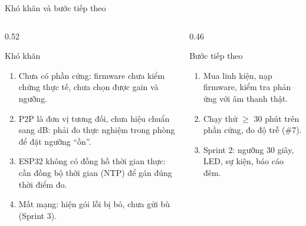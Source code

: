 \documentclass[t, aspectratio=169]{beamer}
\begin{document}
\begin{frame}{Khó khăn và bước tiếp theo}
  \scriptsize
  \begin{columns}[T]
    \begin{column}{0.52\textwidth}
      \begin{alertblock}{Khó khăn}
        \footnotesize
        \begin{enumerate}\setlength{\itemsep}{1pt}
          \item Chưa có phần cứng: firmware chưa kiểm chứng thực tế, chưa chọn được gain và ngưỡng.
          \item P2P là đơn vị tương đối, chưa hiệu chuẩn sang dB: phải đo thực nghiệm trong phòng để đặt ngưỡng ``ồn''.
          \item ESP32 không có đồng hồ thời gian thực: cần đồng bộ thời gian (NTP) để gán đúng thời điểm đo.
          \item Mất mạng: hiện gói lỗi bị bỏ, chưa gửi bù (Sprint 3).
        \end{enumerate}
      \end{alertblock}
    \end{column}
    \begin{column}{0.46\textwidth}
      \begin{block}{Bước tiếp theo}
        \footnotesize
        \begin{enumerate}\setlength{\itemsep}{1pt}
          \item Mua linh kiện, nạp firmware, kiểm tra phản ứng với âm thanh thật.
          \item Chạy thử $\geq$ 30 phút trên phần cứng, đo độ trễ (\#7).
          \item Sprint 2: ngưỡng 30 giây, LED, sự kiện, báo cáo đêm.
        \end{enumerate}
      \end{block}
    \end{column}
  \end{columns}
\end{frame}


\hustthankyou
\end{document}
